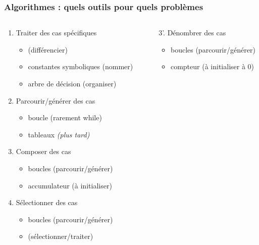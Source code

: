 \documentclass[xcolor=pdftex,svgnames,table]{beamer}
\begin{document}
\begin{frame}
  \frametitle{Algorithmes : quels outils pour quels problèmes}
\pause
\begin{columns}
 \begin{column}[t]{0.59\linewidth}
  \begin{enumerate}
    \item  Traiter des cas spécifiques
      \begin{itemize}
      \item \alert{} (différencier)
      \item \alert{} constantes symboliques (nommer)
      \item arbre de décision (organiser)
     \end{itemize}\pause
    \item Parcourir/générer des cas\pause
      \begin{itemize}
      \item \alert{boucle } (rarement while)
      \item tableaux \emph{(plus tard)}
      \end{itemize}\pause
   \item Composer des cas
      \begin{itemize}
        \item boucles (parcourir/générer)
        \pause
      \item \alert{accumulateur} (à initialiser)
      \end{itemize}\pause
   \item Sélectionner des cas
      \begin{itemize}
        \item boucles (parcourir/générer)
        \item \alert{}  (sélectionner/traiter)
      \end{itemize}
\setcounter{savedenumi}{\value{enumi}}
\end{enumerate}
\end{column}\hspace{-1cm}
\pause
\begin{column}[t]{0.59\linewidth}
\begin{enumerate}
    \item[3'.] Dénombrer des cas
      \begin{itemize}
        \item boucles (parcourir/générer)
          \pause
        \item \alert{compteur} (à initialiser à 0)
      \end{itemize}\pause

\end{enumerate}
\end{column}
\end{columns}
\end{frame}
\end{document}
